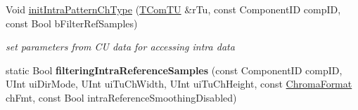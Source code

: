 \begin{DoxyCompactItemize}
\item 
\mbox{\label{class_t_com_prediction_aedd02d40e0007a7814e072c5c90e5931}} 
Void \hyperlink{class_t_com_prediction_aedd02d40e0007a7814e072c5c90e5931}{init\+Intra\+Pattern\+Ch\+Type} (\hyperlink{class_t_com_t_u}{T\+Com\+TU} \&r\+Tu, const Component\+ID comp\+ID, const Bool b\+Filter\+Ref\+Samples)
\begin{DoxyCompactList}\small\item\em set parameters from CU data for accessing intra data \end{DoxyCompactList}\item 
\mbox{\label{class_t_com_prediction_a9ce2a5ad89e5e362cfd931343b3ac2ee}} 
static Bool {\bfseries filtering\+Intra\+Reference\+Samples} (const Component\+ID comp\+ID, U\+Int ui\+Dir\+Mode, U\+Int ui\+Tu\+Ch\+Width, U\+Int ui\+Tu\+Ch\+Height, const \hyperlink{_type_def_8h_a4a6c51c10f2eb04abc7209db7caff39f}{Chroma\+Format} ch\+Fmt, const Bool intra\+Reference\+Smoothing\+Disabled)
\end{DoxyCompactItemize}
